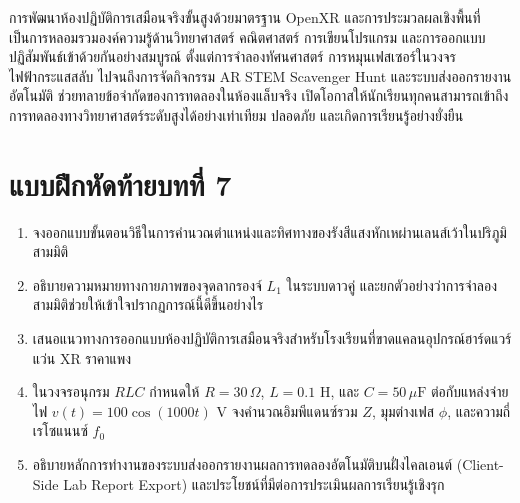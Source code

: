 การพัฒนาห้องปฏิบัติการเสมือนจริงขั้นสูงด้วยมาตรฐาน OpenXR และการประมวลผลเชิงพื้นที่เป็นการหลอมรวมองค์ความรู้ด้านวิทยาศาสตร์ คณิตศาสตร์ การเขียนโปรแกรม และการออกแบบปฏิสัมพันธ์เข้าด้วยกันอย่างสมบูรณ์ ตั้งแต่การจำลองทัศนศาสตร์ การหมุนเฟสเซอร์ในวงจรไฟฟ้ากระแสสลับ ไปจนถึงการจัดกิจกรรม AR STEM Scavenger Hunt และระบบส่งออกรายงานอัตโนมัติ ช่วยทลายข้อจำกัดของการทดลองในห้องแล็บจริง เปิดโอกาสให้นักเรียนทุกคนสามารถเข้าถึงการทดลองทางวิทยาศาสตร์ระดับสูงได้อย่างเท่าเทียม ปลอดภัย และเกิดการเรียนรู้อย่างยั่งยืน

\clearpage

\section*{แบบฝึกหัดท้ายบทที่ 7}

\begin{enumerate}
    \item จงออกแบบขั้นตอนวิธีในการคำนวณตำแหน่งและทิศทางของรังสีแสงหักเหผ่านเลนส์เว้าในปริภูมิสามมิติ
    \item อธิบายความหมายทางกายภาพของจุดลากรองจ์ $L_1$ ในระบบดาวคู่ และยกตัวอย่างว่าการจำลองสามมิติช่วยให้เข้าใจปรากฏการณ์นี้ดีขึ้นอย่างไร
    \item เสนอแนวทางการออกแบบห้องปฏิบัติการเสมือนจริงสำหรับโรงเรียนที่ขาดแคลนอุปกรณ์ฮาร์ดแวร์แว่น XR ราคาแพง
    \item ในวงจรอนุกรม $RLC$ กำหนดให้ $R = 30\,\Omega$, $L = 0.1\text{ H}$, และ $C = 50\,\mu\text{F}$ ต่อกับแหล่งจ่ายไฟ $v(t) = 100\cos(1000 t)\text{ V}$ จงคำนวณอิมพีแดนซ์รวม $Z$, มุมต่างเฟส $\phi$, และความถี่เรโซแนนซ์ $f_0$
    \item อธิบายหลักการทำงานของระบบส่งออกรายงานผลการทดลองอัตโนมัติบนฝั่งไคลเอนต์ (Client-Side Lab Report Export) และประโยชน์ที่มีต่อการประเมินผลการเรียนรู้เชิงรุก
\end{enumerate}
